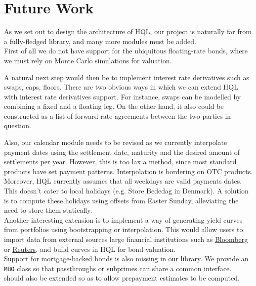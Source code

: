 \chapter{Future Work}

As we set out to design the architecture of HQL, our project is naturally far 
from a fully-fledged library, and many more modules must be added.\\

First of all we do not have support for the ubiquitous floating-rate bonds, 
where we must rely on Monte Carlo simulations for valuation.

A natural next step would then be to implement interest rate derivatives such 
as swaps, caps, floors.
There are two obvious ways in which we can extend HQL with interest rate 
derivatives support. For instance, swaps can be modelled by combining a fixed 
and a floating leg. On the other hand, it also could be constructed as a list of 
forward-rate agreements between the two parties in question.\\


Also, our calendar module needs to be revised as we currently interpolate 
payment dates using the settlement date, maturity and the desired amount of 
settlements per year. However, this is too lax a method, since most standard 
products have set payment patterns. Interpolation is bordering on OTC products.
Moreover, HQL currently assumes that all weekdays are valid payments dates. 
This doesn’t cater to local holidays (e.g. Store Bededag in Denmark). A 
solution is to compute these holidays using offsets from Easter Sunday, 
alleviating the need to store them statically.\\

Another interesting extension is to implement a way of generating yield curves 
from portfolios using bootstrapping or interpolation\cite{cmunk}.
This would allow users to import data from external sources large financial
institutions such as \href{www.bloomberg.com}{Bloomberg} or
\href{www.reuters.com}{Reuters}, and build curves in HQL for bond valuation.\\

Support for mortgage-backed bonds is also missing in our library. We provide an 
\texttt{MBO} class so that passthroughs or subprimes can share a common interface.
\hql should also be extended so as to allow prepayment estimates to be computed.\\

